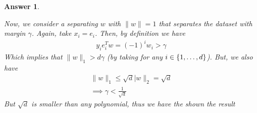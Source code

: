 \documentclass[12pt]{article}
\theoremstyle{colon}
\newtheorem*{answer}{Answer}
\begin{document}
\begin{answer}
\begin{enumerate}[label=\arabic*)]
      Now, we consider a separating $w$ with $\lVert w \rVert = 1$ that separates the dataset with margin $\gamma$. Again, take $x_i = e_i$. Then, by definition we have
      \begin{gather*}
       y_i e_i^T w = (-1)^i w_i > \gamma
      \end{gather*}
      Which implies that $\lVert w \rVert_1 > d \gamma$ (by taking for any $i \in \{1, \mathellipsis, d\}$). But, we also have
      \begin{gather*}
        \lVert w \rVert_1 \leq \sqrt{d} \lvert w \rVert_2 = \sqrt{d} \\
        \implies \gamma < \frac{1}{\sqrt{d}}
      \end{gather*}
      But $\sqrt{d}$ is smaller than any polynomial, thus we have the shown the result
  \end{enumerate}
\end{answer}
\end{document}
